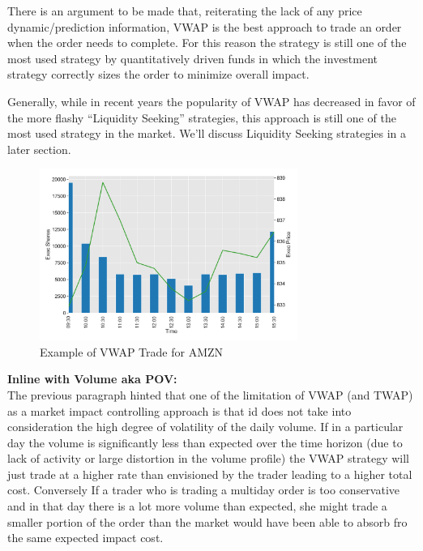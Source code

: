 There is an argument to be made that, reiterating the lack of any price dynamic/prediction information, VWAP is the best approach to trade an order when the order needs to complete. For this reason the strategy is still one of the most used strategy by quantitatively driven funds in which the investment strategy correctly sizes the order to minimize overall impact. 

Generally, while in recent years the popularity of VWAP has decreased in favor of the more flashy ``Liquidity Seeking'' strategies, this approach is still one of the most used strategy in the market. We'll discuss Liquidity Seeking strategies in a later section. \\


        \begin{figure}[!ht]
        \centering
        \includegraphics[width=0.75\textwidth]{chapters/chapter_exec_models/figures/vwap.png} 
        \caption{Example of VWAP Trade for AMZN\label{fig:vwap}}
        \end{figure}


\noindent\textbf{Inline with Volume aka POV:} \\


The previous paragraph hinted that one of the limitation of VWAP (and TWAP) as a market impact controlling approach is that id does not take into consideration the high degree of volatility of the daily volume. If in a particular day the volume is significantly less than expected over the time horizon (due to lack of activity or large distortion in the volume profile) the VWAP strategy will just trade at a higher rate than envisioned by the trader leading to a higher total cost. Conversely If a trader who is trading a multiday order is too conservative and in that day there is a lot more volume than expected, she might trade a smaller portion of the order than the market would have been able to absorb fro the same expected impact cost.

